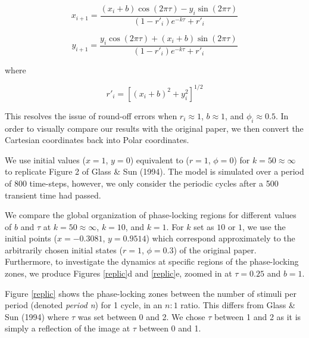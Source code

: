 \begin{equation}
    x_{i+1} = \frac{(x_i + b)\cos(2\pi\tau) - y_i \sin(2\pi\tau)}{(1 - r'_i)e^{-k\tau}+r'_i}
    \label{eqn:7}
\end{equation}

\begin{equation}
    y_{i+1} = \frac{y_i \cos(2\pi\tau) + (x_i + b) \sin(2\pi\tau)}{(1-r'_i)e^{-k\tau} + r'_i}
    \label{eqn:8}
\end{equation}

where

\begin{equation}
    r'_i = [(x_i + b)^2 + y^2_i]^{1/2} \nonumber 
\end{equation}

This resolves the issue of round-off errors when $r_i \approx 1$, $b \approx 1$, and $\phi_i \approx 0.5$. In order to visually compare our results with the original paper, we then convert the Cartesian coordinates back into Polar coordinates.

We use initial values ($x = 1$, $y = 0$) equivalent to ($r = 1$, $\phi = 0$) for $k=50\approx \infty$ to replicate Figure 2 of Glass \& Sun (1994)\supercite{GLASS1994}. The model is simulated over a period of 800 time-steps, however, we only consider the periodic cycles after a 500 transient time had passed.

We compare the global organization of phase-locking regions for different values of $b$ and $\tau$ at $k=50\approx \infty$, $k = 10$, and $k = 1$. For $k$ set as $10$ or $1$, we use the initial points ($x = -0.3081$, $y = 0.9514$) which correspond approximately to the arbitrarily chosen initial states ($r = 1$, $\phi = 0.3$) of the original paper. Furthermore, to investigate the dynamics at specific regions of the phase-locking zones, we produce Figures \ref{replic}d and \ref{replic}e, zoomed in at $\tau = 0.25$ and $b = 1$.

Figure \ref{replic} shows the phase-locking zones between the number of stimuli per period (denoted \emph{period n}) for 1 cycle, in an $n:1$ ratio. This differs from Glass \& Sun (1994)\supercite{GLASS1994} where $\tau$ was set between 0 and 2. We chose $\tau$ between 1 and 2 as it is simply a reflection of the image at $\tau$ between 0 and 1.

